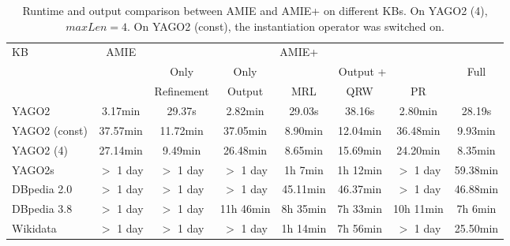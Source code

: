\begin{center}
\begin{savenotes}
\begin{table}[t]
\centering
\footnotesize
\begin{tabular}{|l|c|c|c|c|c|c|c|}
\hline
\multirow{3}{*}{KB} 	& \multirow{3}{*}{AMIE}  	& \multicolumn{5}{c}{AMIE+} 	\\ \cline{3-8}
 			& 				& Only	& Only		& \multicolumn{3}{c|}{Output +}   										& \multirow{2}{*}{Full}  \\ \cline{5-7}
			&  				& Refinement			&   Output				& MRL     			&QRW 		&PR				& 	   	   	\\ \hline
  YAGO2  		& 3.17min  			&29.37s				& 2.82min  			& 29.03s  	 		&38.16s 	&2.80min  			& 28.19s	   	\\ \hline
  YAGO2 (const)  	& 37.57min  			&11.72min			& 37.05min 			& 8.90min  			&12.04min 	&36.48min  			& 9.93min	   	\\ \hline
  YAGO2 (4)  		& 27.14min  			&9.49min			& 26.48min 			& 8.65min  			&15.69min 	&24.20min  			& 8.35min 	   	\\ \hline
  YAGO2s  		& $>$ 1 day  			&$>$ 1 day			&$>$ 1 day 			& 1h 7min  		    	&1h 12min	&$>$ 1 day  			& 59.38min	   	\\ \hline
  DBpedia 2.0  		& $>$ 1 day  			&$>$ 1 day			&$>$ 1 day 			& 45.11min  		    	&46.37min       &$>$ 1 day  			& 46.88min	   	\\ \hline
  DBpedia 3.8  		& $>$ 1 day  			&$>$ 1 day			&11h 46min			& 8h 35min 			&7h 33min	&10h 11min  			& 7h 6min 	   	\\ \hline
  Wikidata  		& $>$ 1 day  			&$>$ 1 day			&$>$ 1 day 			& 1h 14min 			&7h 56min	&$>$ 1 day	  		& 25.50min	   	\\ \hline
\end{tabular}
\caption{Runtime and output comparison between AMIE and AMIE+ on different KBs. On YAGO2 (4), $maxLen=4$. On YAGO2 (const), the instantiation operator was switched on.}
\label{amievsplus}
\end{table}
\end{savenotes}
\end{center}
%
